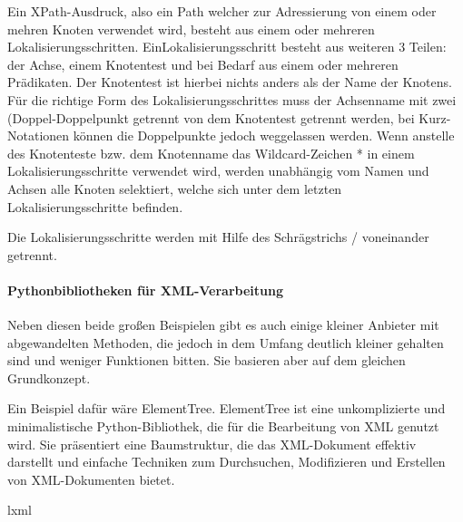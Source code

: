 Ein XPath-Ausdruck, also ein Path welcher zur Adressierung von einem oder mehren Knoten verwendet wird,
besteht aus einem oder mehreren Lokalisierungsschritten.
EinLokalisierungsschritt besteht aus weiteren 3 Teilen: der Achse, einem Knotentest und bei Bedarf aus einem oder mehreren Prädikaten.
Der Knotentest ist hierbei nichts anders als der Name der Knotens.
Für die richtige Form des Lokalisierungsschrittes muss der Achsenname mit zwei
(Doppel-Doppelpunkt getrennt von dem Knotentest getrennt werden, bei Kurz-Notationen können die Doppelpunkte jedoch weggelassen werden.
Wenn anstelle des Knotenteste bzw.
dem Knotenname das Wildcard-Zeichen * in einem Lokalisierungsschritte verwendet wird,
werden unabhängig vom Namen und Achsen alle Knoten selektiert, welche sich unter dem letzten Lokalisierungsschritte befinden.

Die Lokalisierungsschritte werden mit Hilfe des Schrägstrichs / voneinander getrennt.










\paragraph{Pythonbibliotheken für XML-Verarbeitung}
Neben diesen beide großen Beispielen gibt es auch einige kleiner Anbieter mit abgewandelten Methoden,
die jedoch in dem Umfang deutlich kleiner gehalten sind und weniger Funktionen bitten.
Sie basieren aber auf dem gleichen Grundkonzept.

Ein Beispiel dafür wäre ElementTree.
ElementTree ist eine unkomplizierte und minimalistische Python-Bibliothek, die für die Bearbeitung von \ac{XML} genutzt wird.
Sie präsentiert eine Baumstruktur, die das \ac{XML}-Dokument effektiv darstellt und einfache Techniken zum Durchsuchen,
Modifizieren und Erstellen von \ac{XML}-Dokumenten bietet.\cite*{ElementTree2025}

lxml
\pagebreak
